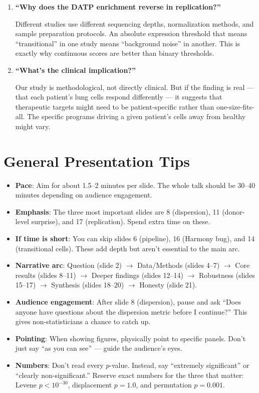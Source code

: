 \documentclass[11pt]{article}
\begin{document}
\begin{enumerate}[leftmargin=*]
\item \textbf{``Why does the DATP enrichment reverse in replication?''}

Different studies use different sequencing depths, normalization methods, and sample preparation protocols. An absolute expression threshold that means ``transitional'' in one study means ``background noise'' in another. This is exactly why continuous scores are better than binary thresholds.

\item \textbf{``What's the clinical implication?''}

Our study is methodological, not directly clinical. But if the finding is real --- that each patient's lung cells respond differently --- it suggests that therapeutic targets might need to be patient-specific rather than one-size-fits-all. The specific programs driving a given patient's cells away from healthy might vary.

\end{enumerate}


\section{General Presentation Tips}

\begin{itemize}
\item \textbf{Pace}: Aim for about 1.5--2 minutes per slide. The whole talk should be 30--40 minutes depending on audience engagement.
\item \textbf{Emphasis}: The three most important slides are 8 (dispersion), 11 (donor-level surprise), and 17 (replication). Spend extra time on these.
\item \textbf{If time is short}: You can skip slides 6 (pipeline), 16 (Harmony bug), and 14 (transitional cells). These add depth but aren't essential to the main arc.
\item \textbf{Narrative arc}: Question (slide 2) $\to$ Data/Methods (slides 4--7) $\to$ Core results (slides 8--11) $\to$ Deeper findings (slides 12--14) $\to$ Robustness (slides 15--17) $\to$ Synthesis (slides 18--20) $\to$ Honesty (slide 21).
\item \textbf{Audience engagement}: After slide 8 (dispersion), pause and ask ``Does anyone have questions about the dispersion metric before I continue?'' This gives non-statisticians a chance to catch up.
\item \textbf{Pointing}: When showing figures, physically point to specific panels. Don't just say ``as you can see'' --- guide the audience's eyes.
\item \textbf{Numbers}: Don't read every $p$-value. Instead, say ``extremely significant'' or ``clearly non-significant.'' Reserve exact numbers for the three that matter: Levene $p < 10^{-30}$, displacement $p = 1.0$, and permutation $p = 0.001$.
\end{itemize}
\end{document}
